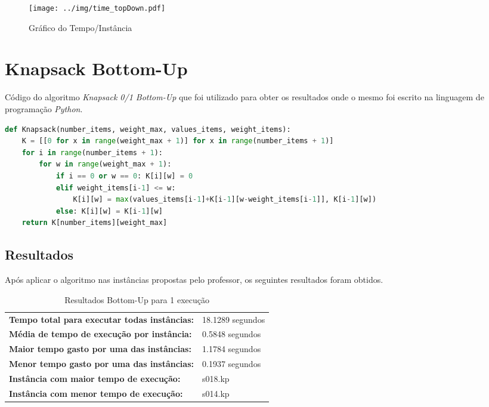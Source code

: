\documentclass[a4paper, 12pt]{article}
\begin{document}
\begin{figure}[!htb]
    \centering
    \texttt{[image: ../img/time\_topDown.pdf]}
    \caption{Gráfico do Tempo/Instância}
    \label{fig:time_topDown}
\end{figure}

\clearpage
\section{Knapsack Bottom-Up}\label{sec:bottomup}
Código do algoritmo {\it Knapsack 0/1 Bottom-Up} que foi utilizado para obter os resultados onde o mesmo foi escrito
na linguagem de programação {\it Python}.\\
\begin{lstlisting}[language=Python, caption=Bottom-Up, label=alg:bottomup]
def Knapsack(number_items, weight_max, values_items, weight_items): 
    K = [[0 for x in range(weight_max + 1)] for x in range(number_items + 1)]
    for i in range(number_items + 1): 
        for w in range(weight_max + 1): 
            if i == 0 or w == 0: K[i][w] = 0
            elif weight_items[i-1] <= w: 
                K[i][w] = max(values_items[i-1]+K[i-1][w-weight_items[i-1]], K[i-1][w]) 
            else: K[i][w] = K[i-1][w] 
    return K[number_items][weight_max]
\end{lstlisting}

\subsection{Resultados}

Após aplicar o algoritmo  nas instâncias propostas pelo professor, os seguintes resultados
foram obtidos.
\begin{table}[!htb]
    \begin{tabular}{ll}
    \textbf{Tempo total para executar todas instâncias:} & 18.1289 segundos \\
    \textbf{Média de tempo de execução por instância:} & 0.5848 segundos \\
    \textbf{Maior tempo gasto por uma das instâncias:} & 1.1784 segundos \\
    \textbf{Menor tempo gasto por uma das instâncias:} & 0.1937 segundos \\
    \textbf{Instância com maior tempo de execução:} & s018.kp \\
    \textbf{Instância com menor tempo de execução:} & s014.kp
    \end{tabular}
    \caption{Resultados Bottom-Up para 1 execução}
    \label{tab:bottomup_exec}
\end{table}
\end{document}
